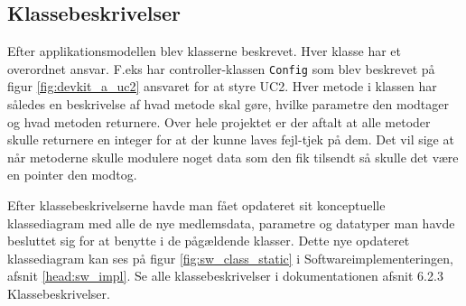 \subsection{Klassebeskrivelser}

Efter applikationsmodellen blev klasserne beskrevet. Hver klasse har et overordnet ansvar. F.eks har controller-klassen \verb+Config+ som blev beskrevet på figur \ref{fig:devkit_a_uc2} ansvaret for at styre UC2. Hver metode i klassen har således en beskrivelse af hvad metode skal gøre, hvilke parametre den modtager og hvad metoden returnere. Over hele projektet er der aftalt at alle metoder skulle returnere en integer for at der kunne laves fejl-tjek på dem. Det vil sige at når metoderne skulle modulere noget data som den fik tilsendt så skulle det være en pointer den modtog.

Efter klassebeskrivelserne havde man fået opdateret sit konceptuelle klassediagram med alle de nye medlemsdata, parametre og datatyper man havde besluttet sig for at benytte i de pågældende klasser. Dette nye opdateret klassediagram kan ses på figur \ref{fig:sw_class_static} i Softwareimplementeringen, afsnit \ref{head:sw_impl}. Se alle klassebeskrivelser i dokumentationen afsnit 6.2.3 Klassebeskrivelser.

